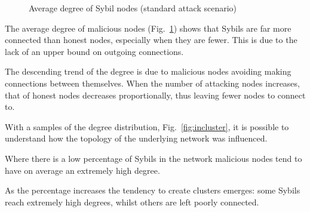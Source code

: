 \begin{figure}[ht]
\begin{minipage}[b]{0.5\linewidth}
			\centering
			\caption{Average degree of Sybil nodes (standard attack scenario)}
			\label{fig:in-atk-degree}
        \end{minipage}
    \end{figure}
    
The average degree of malicious nodes (Fig.~\ref{fig:in-atk-degree}) shows that Sybils are far more connected than honest nodes, especially when they are fewer. This is due to the lack of an upper bound on outgoing connections.

The descending trend of the degree is due to malicious nodes avoiding making connections between themselves. When the number of attacking nodes increases, that of honest nodes decreases proportionally, thus leaving fewer nodes to connect to.

With a samples of the degree distribution, Fig.~\ref{fig:incluster}, it is possible to understand how the topology of the underlying network was influenced. 

Where there is a low percentage of Sybils in the network malicious nodes tend to have on average an extremely high degree.

As the percentage increases the tendency to create clusters emerges: some Sybils reach extremely high degrees, whilst others are left poorly connected.\par


